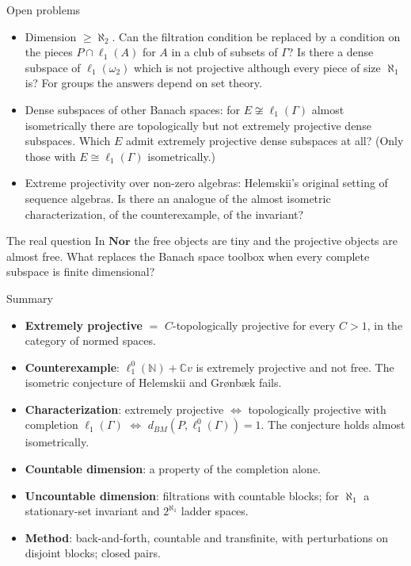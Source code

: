 \documentclass[10pt,aspectratio=169]{beamer}
\newcommand{\Nor}{\mathbf{Nor}}
\newcommand{\lo}[1]{\ell_1^0(#1)}
\newcommand{\ellone}[1]{\ell_1(#1)}
\newcommand{\BM}{d_{BM}}
\newcommand{\NN}{\mathbb N}
\newcommand{\CC}{\mathbb C}
\begin{document}
\begin{frame}{Open problems}
  \begin{itemize}
    \item Dimension $\ge\aleph_2$. Can the filtration condition be replaced by a
      condition on the pieces $P\cap\ellone A$ for $A$ in a club of subsets of
      $\Gamma$? Is there a dense subspace of $\ellone{\omega_2}$ which is not
      projective although every piece of size $\aleph_1$ is? For groups the
      answers depend on set theory.
    \item Dense subspaces of other Banach spaces: for $E\not\cong\ellone\Gamma$
      almost isometrically there are topologically but not extremely projective
      dense subspaces. Which $E$ admit extremely projective dense subspaces at all?
      (Only those with $E\cong\ellone\Gamma$ isometrically.)
    \item Extreme projectivity over non-zero algebras: Helemskii's original
      setting of sequence algebras. Is there an analogue of the almost isometric
      characterization, of the counterexample, of the invariant?
  \end{itemize}
  \begin{alertblock}{The real question}
    In $\Nor$ the free objects are tiny and the projective objects are
    almost free. What replaces the Banach space toolbox when every complete
    subspace is finite dimensional?
  \end{alertblock}
\end{frame}

\begin{frame}{Summary}
  \begin{itemize}
    \item \textbf{Extremely projective} $=$ $C$-topologically projective for every
      $C>1$, in the category of normed spaces.
    \item \textbf{Counterexample}: $\lo\NN+\CC v$ is extremely projective and not
      free. The isometric conjecture of Helemskii and Gr{\o}nb{\ae}k fails.
    \item \textbf{Characterization}: extremely projective $\iff$ topologically
      projective with completion $\ellone\Gamma$ $\iff$ $\BM(P,\lo\Gamma)=1$.
      The conjecture holds almost isometrically.
    \item \textbf{Countable dimension}: a property of the completion alone.
    \item \textbf{Uncountable dimension}: filtrations with countable blocks;
      for $\aleph_1$ a stationary-set invariant and $2^{\aleph_1}$ ladder spaces.
    \item \textbf{Method}: back-and-forth, countable and transfinite, with
      perturbations on disjoint blocks; closed pairs.
  \end{itemize}
  \vfill
  \vfill
\end{frame}
\end{document}
